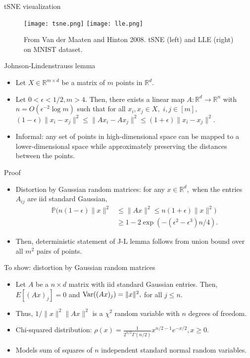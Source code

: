 \documentclass[final]{beamer}
\begin{document}
\begin{frame}{tSNE visualization}
\begin{figure}
	\texttt{[image: tsne.png]}
	\texttt{[image: lle.png]}
	\caption{From Van der Maaten and Hinton 2008. tSNE (left) and LLE (right) on MNIST dataset. }
\end{figure}
\end{frame}
\begin{frame}{Johnson-Lindenstrauss lemma}
\begin{itemize}
	\item Let $X \in \mathbb{R}^{m\times d}$ be a matrix of $m$ points in $\mathbb{R}^d.$
	\pause
\item Let $0 < \epsilon < 1/2, m > 4.$ Then, there exists a linear map $A: \mathbb{R}^d \to \mathbb{R}^n$ with $n = O(\epsilon^{-2} \log m)$ such that for all $x_i,x_j \in X,$ $i, j \in [m],$ $(1-\epsilon)\|x_i-x_j\|^2 \leq \|Ax_i - Ax_j\|^2 \leq (1+\epsilon)\|x_i-x_j\|^2.$
	\pause
	\item Informal: any set of points in high-dimensional space can be mapped to a lower-dimensional space while approximately preserving the distances between the points.
\end{itemize}
\end{frame}
\begin{frame}{Proof}

\begin{itemize}
	\item Distortion by Gaussian random matrices: for any $x \in \mathbb{R}^d,$ when the entries $A_{ij}$ are iid standard Gaussian, 
		\begin{align*}
			\mathbb{P}(n(1 - \epsilon)\|x\|^2 &\leq \|Ax\|^2 \leq n(1+\epsilon)\|x\|^2)\\
			&\geq 1 - 2\exp(-(\epsilon^2 - \epsilon^3) n/4).
		\end{align*}
	\pause
\item Then, deterministic statement of J-L lemma follows from union bound over all $m^2$ pairs of points.
\end{itemize}

\end{frame}
\begin{frame}{To show: distortion by Gaussian random matrices}
\begin{itemize}
	\item Let $A$ be a $n \times d$ matrix with iid standard Gaussian entries. Then, $E[(Ax)_j] = 0$ and ${\rm Var}((Ax)_j) = \|x\|^2,$ for all $j \leq n.$
	\pause
	\item Thus, $1/\|x\|^2 \|Ax\|^2$ is a $\chi^2$ random variable with $n$ degrees of freedom.
	\pause
	\item Chi-squared distribution: $\rho(x) = \frac{1}{2^{n/2}\Gamma(n/2)} x^{n/2 - 1} e^{-x/2}, x\geq 0.$
	\pause
	\item Models sum of squares of $n$ independent standard normal random variables.
\end{itemize}
\end{frame}
\end{document}
